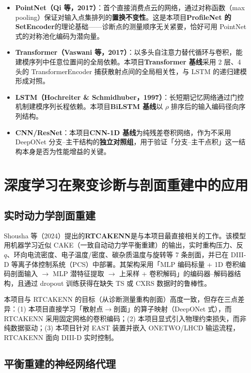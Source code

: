 \documentclass[12pt,a4paper]{article}
\begin{document}
\begin{itemize}
    \item \textbf{PointNet（Qi 等，2017）}：首个直接消费点云的网络，通过对称函数（max pooling）保证对输入点集排列的\textbf{置换不变性}。这是本项目\textbf{ProfileNet 的 SetEncoder}的理论基础——诊断点的测量顺序无关紧要，恰好可用 PointNet 式的对称池化编码为潜向量。
    \item \textbf{Transformer（Vaswani 等，2017）}：以多头自注意力替代循环与卷积，能建模序列中任意位置间的全局依赖。本项目\textbf{Transformer 基线}采用 2 层、4 头的 TransformerEncoder 捕获散射点间的全局相关性，与 LSTM 的递归建模形成对照。
    \item \textbf{LSTM（Hochreiter \& Schmidhuber，1997）}：长短期记忆网络通过门控机制建模序列长程依赖。本项目\textbf{BiLSTM 基线}以 $\rho$ 排序后的输入编码径向序列结构。
    \item \textbf{CNN/ResNet}：本项目\textbf{CNN-1D 基线}为纯残差卷积网络，作为不采用 DeepONet 分支--主干结构的\textbf{独立对照组}，用于验证「分支--主干点积」这一结构本身是否为性能增益的关键。
\end{itemize}

\section{深度学习在聚变诊断与剖面重建中的应用}

\subsection{实时动力学剖面重建}

Shousha 等（2024）提出的\textbf{RTCAKENN}是与本项目最直接相关的工作。该模型用机器学习近似 CAKE（一致自动动力学平衡重建）的输出，实时重构压力、反 $q$、环向电流密度、电子温度/密度、碳杂质温度与旋转等 7 条剖面，并已在 DIII-D 等离子体控制系统（PCS）中部署。其架构采用「MLP 编码标量 + 1D 卷积编码剖面输入 $\to$ MLP 潜特征提取 $\to$ 上采样 + 卷积解码」的编码器--解码器结构，且通过 dropout 训练获得在缺失 TS 或 CXRS 数据时的鲁棒性。

本项目与 RTCAKENN 的目标（从诊断测量重构剖面）高度一致，但存在三点差异：(1) 本项目直接学习「散射点$\to$剖面」的算子映射（DeepONet 式），而 RTCAKENN 采用固定网格的卷积编码；(2) 本项目显式引入物理约束损失，而非纯数据驱动；(3) 本项目针对 EAST 装置并嵌入 ONETWO/LHCD 输运流程，RTCAKENN 面向 DIII-D 实时控制。

\subsection{平衡重建的神经网络代理}
\end{document}
